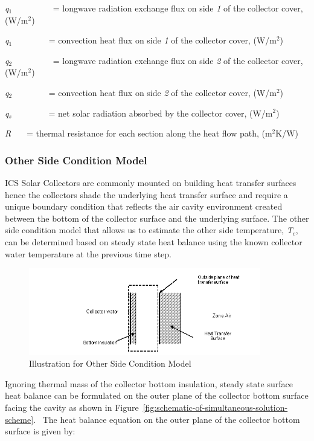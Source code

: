\emph{q\(_{1}\)}~~~~~~~~~ = longwave radiation exchange flux on side \emph{1} of the collector cover, (W/m\(^{2}\))

\emph{q\(_{1}\)}~~~~~~~~ = convection heat flux on side \emph{1} of the collector cover, (W/m\(^{2}\))

\emph{q\(_{2}\)}~~~~~~~~~ = longwave radiation exchange flux on side \emph{2} of the collector cover, (W/m\(^{2}\))

\emph{q\(_{2}\)}~~~~~~~~ = convection heat flux on side \emph{2} of the collector cover, (W/m\(^{2}\))

\emph{q\(_{s}\)}~~~~~~~~ = net solar radiation absorbed by the collector cover, (W/m\(^{2}\))

\emph{R}~~~ = thermal resistance for each section along the heat flow path, (m\(^{2}\)K/W)

\subsubsection{Other Side Condition Model}\label{other-side-condition-model}

ICS Solar Collectors are commonly mounted on building heat transfer surfaces hence the collectors shade the underlying heat transfer surface and require a unique boundary condition that reflects the air cavity environment created between the bottom of the collector surface and the underlying surface. The other side condition model that allows us to estimate the other side temperature, \emph{T\(_{c}\)}, can be determined based on steady state heat balance using the known collector water temperature at the previous time step.

\begin{figure}[hbtp] %
\centering
\includegraphics[width=0.9\textwidth, height=0.9\textheight, keepaspectratio=true]{media/image6527.png}
\caption{Illustration for Other Side Condition Model \protect \label{fig:illustration-for-other-side-condition-model}}
\end{figure}

Ignoring thermal mass of the collector bottom insulation, steady state surface heat balance can be formulated on the outer plane of the collector bottom surface facing the cavity as shown in Figure~\ref{fig:schematic-of-simultaneous-solution-scheme}.~ The heat balance equation on the outer plane of the collector bottom surface is given by:

